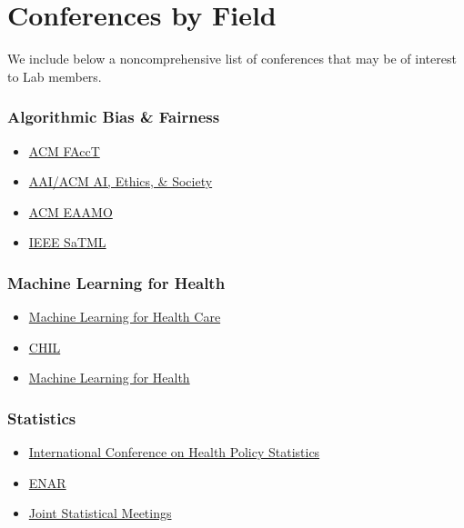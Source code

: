 \documentclass[
]{book}
\providecommand{\tightlist}{%
  \setlength{\itemsep}{0pt}\setlength{\parskip}{0pt}}
\begin{document}
\hypertarget{conferences-by-field}{%
\section{Conferences by Field}\label{conferences-by-field}}

We include below a noncomprehensive list of conferences that may be of interest to Lab members.

\hypertarget{algorithmic-bias-fairness}{%
\subsubsection*{Algorithmic Bias \& Fairness}\label{algorithmic-bias-fairness}}

\begin{itemize}
\tightlist
\item
  \href{https://facctconference.org}{ACM FAccT}
\item
  \href{https://www.aies-conference.com/}{AAI/ACM AI, Ethics, \& Society}
\item
  \href{https://eaamo.org/}{ACM EAAMO}
\item
  \href{https://satml.org/}{IEEE SaTML}
\end{itemize}

\hypertarget{machine-learning-for-health}{%
\subsubsection*{Machine Learning for Health}\label{machine-learning-for-health}}

\begin{itemize}
\tightlist
\item
  \href{https://www.mlforhc.org/}{Machine Learning for Health Care}
\item
  \href{https://www.chilconference.org/}{CHIL}
\item
  \href{https://ml4health.github.io/}{Machine Learning for Health}
\end{itemize}

\hypertarget{statistics}{%
\subsubsection*{Statistics}\label{statistics}}

\begin{itemize}
\tightlist
\item
  \href{https://ww2.amstat.org/meetings/ichps/2020/}{International Conference on Health Policy Statistics}
\item
  \href{https://www.enar.org/meetings/future.cfm}{ENAR}
\item
  \href{https://www.amstat.org/asa/meetings/Joint-Statistical-Meetings.aspx}{Joint Statistical Meetings}
\end{itemize}
\end{document}
